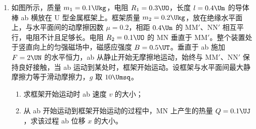\documentclass[\gkver]{gaokaozhenti}
\begin{document}
\begin{enumerate}

\item
如图所示，质量 $m_{1}=0.1\Ukg$，电阻 $R_{1}=0.3\UO$，长度 $l=0.4\Um$ 的导体棒 ab 横放在 U 型金属框架上。框架质量 $m_{2}=0.2\Ukg$，放在绝缘水平面上，与水平面间的动摩擦因数 $\mu=0.2$，相距 $0.4\Um$ 的 MM$'$、NN$'$ 相互平行，电阻不计且足够长。电阻 $R_{2}=0.1\UO$ 的 MN 垂直于 MM$'$。整个装置处于竖直向上的匀强磁场中，磁感应强度 $B=0.5\UT$。垂直于 ab 施加 $F=2\UN$ 的水平恒力，ab 从静止开始无摩擦地运动，始终与 MM$'$、NN$'$ 保持良好接触，当 ab 运动到某处时，框架开始运动。设框架与水平面间最大静摩擦力等于滑动摩擦力，$g$ 取 $10\Umsq$。

\begin{enumerate}
	\item
	求框架开始运动时 ab 速度 $v$ 的大小；
	\item
	从 ab 开始运动到框架开始运动的过程中，MN 上产生的热量 $Q=0.1\UJ$，求该过程 ab 位移 $x$ 的大小。
\end{enumerate}

\end{enumerate}
\end{document}
